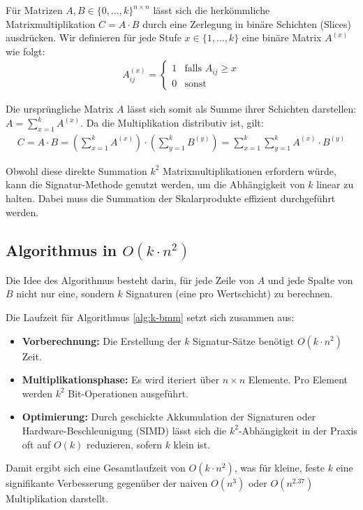 ﻿\documentclass[a4paper,12pt]{article}
\theoremstyle{definition}
\begin{document}
Für Matrizen $A, B \in \{0, \dots, k\}^{n \times n}$ lässt sich die herkömmliche Matrixmultiplikation $C = A \cdot B$ durch eine Zerlegung in binäre Schichten (Slices) ausdrücken. Wir definieren für jede Stufe $x \in \{1, \dots, k\}$ eine binäre Matrix $A^{(x)}$ wie folgt:
\begin{align}
	A^{(x)}_{ij} = \begin{cases} 1 & \text{falls } A_{ij} \geq x \\ 0 & \text{sonst} \end{cases}
\end{align}

Die ursprüngliche Matrix $A$ lässt sich somit als Summe ihrer Schichten darstellen: $A = \sum_{x=1}^{k} A^{(x)}$. Da die Multiplikation distributiv ist, gilt:
\begin{align}
	C = A \cdot B = \left( \sum_{x=1}^{k} A^{(x)} \right) \cdot \left( \sum_{y=1}^{k} B^{(y)} \right) = \sum_{x=1}^{k} \sum_{y=1}^{k} A^{(x)} \cdot B^{(y)}
\end{align}

Obwohl diese direkte Summation $k^2$ Matrixmultiplikationen erfordern würde, kann die Signatur-Methode genutzt werden, um die Abhängigkeit von $k$ linear zu halten. Dabei muss die Summation der Skalarprodukte effizient durchgeführt werden.

\subsection{Algorithmus in $O(k \cdot n^2)$}

Die Idee des Algorithmus besteht darin, für jede Zeile von $A$ und jede Spalte von $B$ nicht nur eine, sondern $k$ Signaturen (eine pro Wertschicht) zu berechnen.

Die Laufzeit für Algorithmus \ref*{alg:k-bmm} setzt sich zusammen aus:
\begin{itemize}
	\item \textbf{Vorberechnung:} Die Erstellung der $k$ Signatur-Sätze benötigt $O(k \cdot n^2)$ Zeit.
	\item \textbf{Multiplikationsphase:} Es wird iteriert über $n \times n$ Elemente. Pro Element werden $k^2$ Bit-Operationen ausgeführt.
	\item \textbf{Optimierung:} Durch geschickte Akkumulation der Signaturen oder Hardware-Beschleunigung (SIMD) lässt sich die $k^2$-Abhängigkeit in der Praxis oft auf $O(k)$ reduzieren, sofern $k$ klein ist.
\end{itemize}
Damit ergibt sich eine Gesamtlaufzeit von $O(k \cdot n^2)$, was für kleine, feste $k$ eine signifikante Verbesserung gegenüber der naiven $O(n^3)$ oder $O(n^{2.37})$ Multiplikation darstellt.
\end{document}
